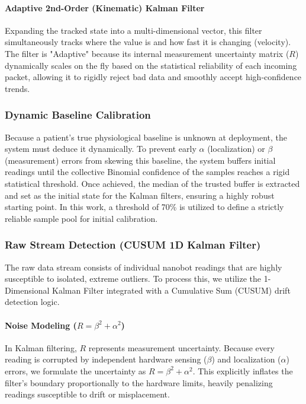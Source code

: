 \documentclass[sigconf]{acmart}
\begin{document}
\paragraph{Adaptive 2nd-Order (Kinematic) Kalman Filter} Expanding the tracked state into a multi-dimensional vector, this filter simultaneously tracks where the value is and how fast it is changing (velocity). The filter is "Adaptive" because its internal measurement uncertainty matrix ($R$) dynamically scales on the fly based on the statistical reliability of each incoming packet, allowing it to rigidly reject bad data and smoothly accept high-confidence trends.

\subsubsection{Dynamic Baseline Calibration}
Because a patient's true physiological baseline is unknown at deployment, the system must deduce it dynamically. To prevent early $\alpha$ (localization) or $\beta$ (measurement) errors from skewing this baseline, the system buffers initial readings until the collective Binomial confidence of the samples reaches a rigid statistical threshold. Once achieved, the median of the trusted buffer is extracted and set as the initial state for the Kalman filters, ensuring a highly robust starting point. In this work, a threshold of 70\% is utilized to define a strictly reliable sample pool for initial calibration.

\subsubsection{Raw Stream Detection (CUSUM 1D Kalman Filter)}
The raw data stream consists of individual nanobot readings that are highly susceptible to isolated, extreme outliers. To process this, we utilize the 1-Dimensional Kalman Filter integrated with a Cumulative Sum (CUSUM) drift detection logic.

\paragraph{Noise Modeling ($R = \beta^2 + \alpha^2$)} In Kalman filtering, $R$ represents measurement uncertainty. Because every reading is corrupted by independent hardware sensing ($\beta$) and localization ($\alpha$) errors, we formulate the uncertainty as $R = \beta^2 + \alpha^2$. This explicitly inflates the filter's boundary proportionally to the hardware limits, heavily penalizing readings susceptible to drift or misplacement.
\end{document}
